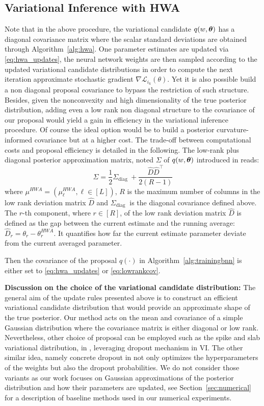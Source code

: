 \documentclass{article} %
\begin{document}
\subsection{Variational Inference with HWA}
Note that in the above procedure, the variational candidate $q(w, \param)$ has a diagonal covariance matrix where the scalar standard deviations are obtained through Algorithm~\ref{alg:hwa}.
One parameter estimates are updated via \eqref{eq:hwa_updates}, the neural network weights are then sampled according to the updated variational candidate distributions in order to compute the next iteration approximate stochastic gradient $\nabla \mathcal{L}_{i_{k}}(\theta)$.
Yet it is also possible build a non diagonal proposal covariance to bypass the restriction of such structure.
Besides, given the nonconvexity and high dimensionality of the true posterior distribution, adding even a low rank non diagonal structure to the covariance of our proposal would yield a gain in efficiency in the variational inference procedure.
Of course the ideal option would be to build a posterior curvature-informed covariance but at a higher cost.
The trade-off between computational costs and proposal efficiency is detailed in the following.
The low-rank plus diagonal posterior approximation matrix, noted $\Sigma$ of $q(w, \param)$ introduced in \citep{maddox2019simple} reads:
\begin{equation}\label{eq:lowrankcov}
\Sigma = \frac{1}{2} \Sigma_{\text {diag }}+\frac{\widehat{D} \widehat{D}^{\top}}{2(R-1)}
\end{equation}
where $\mu^{HWA} = (\mu_{\ell}^{HWA}, \ell \in [L])$, $R$ is the maximum number of columns in the low rank deviation matrix $\widehat{D}$ and $\Sigma_{\text {diag }}$ is the diagonal covariance defined above. The $r$-th component, where $r \in [R]$, of the  low rank deviation matrix $\widehat{D}$ is defined as the gap between the current estimate and the running average: $\widehat{D}_r = \theta_r - \theta^{HWA}_r$. It quantifies how far the current estimate parameter deviate from the current averaged parameter.

Then the covariance of the proposal $q(\cdot)$ in Algorithm~\ref{alg:trainingbnn} is either set to \eqref{eq:hwa_updates} or \eqref{eq:lowrankcov}.

\textbf{Discussion on the choice of the variational candidate distribution:} 
The general aim of the update rules presented above is to construct an efficient variational candidate distribution that would provide an approximate shape of the true posterior. Our method acts on the mean and covariance of a simple Gaussian distribution where the covariance matrix is either diagonal or low rank.
Nevertheless, other choice of proposal can be employed such as the spike and slab variational distribution, in \citep{gal2016dropout}, leveraging dropout mechanism in VI. 
The other similar idea, namely concrete dropout in \citep{gal2017concrete} not only optimizes the hyperparameters of the weights but also the dropout probabilities.
We do not consider those variants as our work focuses on Gaussian approximations of the posterior distribution and how their parameters are updated, see Section~\ref{sec:numerical} for a description of baseline methods used in our numerical experiments.
\end{document}
